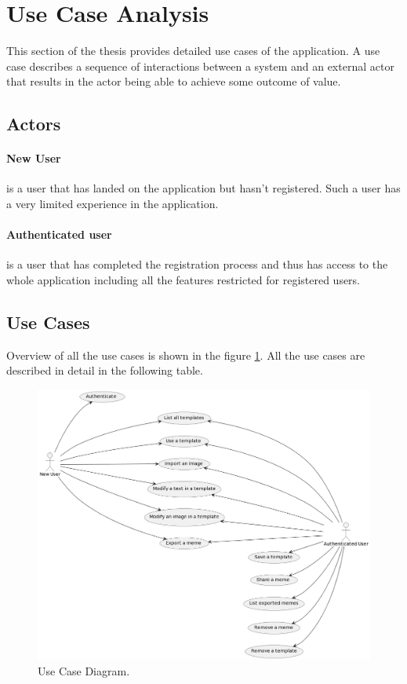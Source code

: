 \section{Use Case Analysis}

This section of the thesis provides detailed use cases of the application. A use case describes a sequence of interactions between a system and an external actor that results in the actor being able to achieve some outcome of value.\cite{software-requirements}

\subsection{Actors}

\paragraph*{New User} is a user that has landed on the application but hasn't registered. Such a user has a very limited experience in the application.

\paragraph*{Authenticated user} is a user that has completed the registration process and thus has access to the whole application including all the features restricted for registered users.

\subsection{Use Cases}

Overview of all the use cases is shown in the figure \ref{fig:use-case}. All the use cases are described in detail in the following table.

\begin{figure}
    \centering
    \includegraphics[width=\textwidth]{text/diagram/use-case.png}
    \caption{Use Case Diagram.}
    \label{fig:use-case}
\end{figure}

